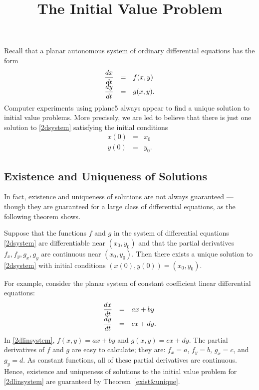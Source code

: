 \documentclass{ximera}
\title{The Initial Value Problem}
\begin{document}
\begin{abstract}
\end{abstract}
\maketitle

\label{S:6.1}

Recall that a planar autonomous  system of
ordinary differential equations has the form
\arraystart
\begin{equation}  \label{2dsystem}
\begin{array}{ccl}
\displaystyle \frac{dx}{dt}  & = & f(x,y) \\
\displaystyle \frac{dy}{dt}  & = & g(x,y).
\end{array}
\end{equation}
\arrayfinish
Computer experiments using {\sf pplane5} always appear to find a unique
solution to initial value problems.  More precisely, we are led to
believe that there is just one solution to \eqref{2dsystem} satisfying
the initial conditions
\begin{eqnarray*}
x(0) & = & x_0 \\
y(0) & = & y_0.
\end{eqnarray*}

\subsection*{Existence and Uniqueness of Solutions}

In fact, existence  and uniqueness
of solutions  are not always guaranteed
--- though they are guaranteed for a large class of differential
equations, as the following theorem shows.

\begin{theorem}  \label{exist&unique}
Suppose that the functions $f$ and $g$ in the system of
differential equations \eqref{2dsystem} are differentiable near
$(x_0,y_0)$ and that the partial derivatives $f_x,f_y,g_x,g_y$
are continuous near $(x_0,y_0)$.  Then there exists a unique
solution to \eqref{2dsystem} with initial conditions
$(x(0),y(0))=(x_0,y_0)$.
\end{theorem} 

For example, consider the planar system of constant coefficient linear
differential equations:
\arraystart
\begin{equation}  \label{2dlinsystem}
\begin{array}{ccl}
\displaystyle \frac{dx}{dt}  & = & ax+by \\
\displaystyle \frac{dy}{dt}  & = & cx+dy.
\end{array}
\end{equation}
\arrayfinish
In \eqref{2dlinsystem}, $f(x,y)=ax+by$ and $g(x,y)=cx+dy$.  The partial
derivatives of $f$ and $g$ are easy to calculate; they are: $f_x=a$, $f_y=b$,
$g_x=c$, and $g_y=d$.  As constant functions, all of these partial
derivatives are continuous.  Hence, existence and uniqueness of solutions to
the initial value problem for \eqref{2dlinsystem} are guaranteed by
Theorem~\ref{exist&unique}.
\end{document}
